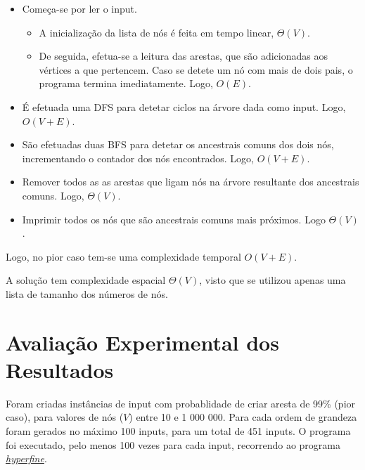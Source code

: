 \documentclass[12pt,a4paper]{article}
\begin{document}
  \begin{itemize}
    \setlength{\itemsep}{0pt}
    \item Começa-se por ler o input.
    \begin{itemize}
      \setlength{\itemsep}{0pt}
      \item A inicialização da lista de nós é feita em tempo linear, $\Theta(V)$.
      \item De seguida, efetua-se a leitura das arestas, que são adicionadas aos vértices a que pertencem.
      Caso se detete um nó com mais de dois pais, o programa termina imediatamente. Logo, $O(E)$.
    \end{itemize}

  \item É efetuada uma DFS para detetar ciclos na árvore dada como input. Logo, $O(V + E)$.

  \item São efetuadas duas BFS para detetar os ancestrais comuns dos dois nós, incrementando o contador dos nós encontrados. Logo, $O(V + E)$.

  \item Remover todos as as arestas que ligam nós na árvore resultante dos ancestrais comuns. Logo, $\Theta(V)$.

  \item Imprimir todos os nós que são ancestrais comuns mais próximos. Logo $\Theta(V)$.
  \end{itemize}

  Logo, no pior caso tem-se uma complexidade temporal $O(V + E)$.

  A solução tem complexidade espacial $\Theta(V)$, visto que se utilizou apenas uma lista de tamanho dos números de nós.

  \section{Avaliação Experimental dos Resultados}

  Foram criadas instâncias de input com probablidade de criar aresta de 99\% (pior caso), para valores de nós ($V$) entre 10 e 1 000 000. Para cada ordem de grandeza foram gerados no máximo 100 inputs, para um total de 451 inputs.
  O programa foi executado, pelo menos 100 vezes para cada input, recorrendo ao programa \href{https://github.com/sharkdp/hyperfine}{\textit{hyperfine}}.
    
\end{document}
